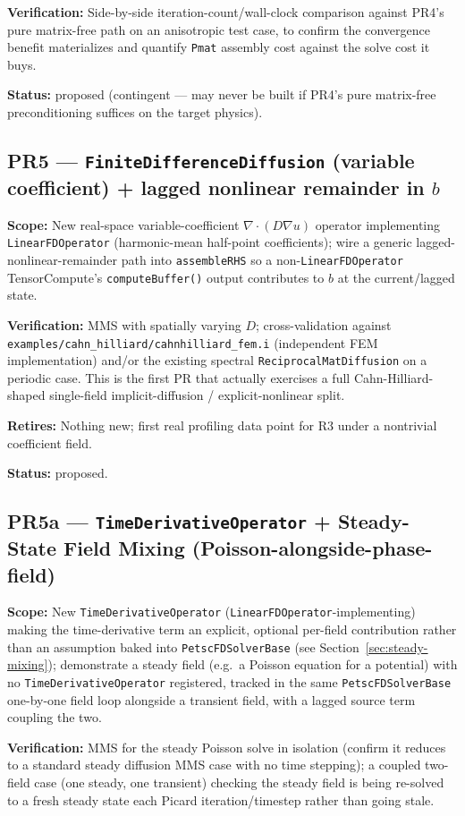 \documentclass[11pt]{article}
\newcommand{\pr}[2]{\subsection{PR#1 --- #2}}
\newcommand{\status}[1]{\textcolor{marlinteal}{\textbf{Status:}} #1}
\begin{document}
\textbf{Verification:} Side-by-side iteration-count/wall-clock comparison
against PR4's pure matrix-free path on an anisotropic test case, to confirm
the convergence benefit materializes and quantify \texttt{Pmat} assembly
cost against the solve cost it buys.

\status{proposed (contingent --- may never be built if PR4's pure
matrix-free preconditioning suffices on the target physics).}

\pr{5}{\texttt{FiniteDifferenceDiffusion} (variable coefficient) + lagged nonlinear remainder in $b$}
\textbf{Scope:} New real-space variable-coefficient $\nabla\cdot(D\nabla u)$
operator implementing \texttt{LinearFDOperator} (harmonic-mean half-point
coefficients); wire a generic lagged-nonlinear-remainder path into
\texttt{assembleRHS} so a non-\texttt{LinearFDOperator} TensorCompute's
\texttt{computeBuffer()} output contributes to $b$ at the current/lagged
state.

\textbf{Verification:} MMS with spatially varying $D$; cross-validation
against \texttt{examples/cahn\_hilliard/cahnhilliard\_fem.i} (independent
FEM implementation) and/or the existing spectral
\texttt{ReciprocalMatDiffusion} on a periodic case. This is the first PR
that actually exercises a full
Cahn-Hilliard-shaped single-field implicit-diffusion / explicit-nonlinear
split.

\textbf{Retires:} Nothing new; first real profiling data point for R3 under
a nontrivial coefficient field.

\status{proposed.}

\pr{5a}{\texttt{TimeDerivativeOperator} + Steady-State Field Mixing (Poisson-alongside-phase-field)}
\textbf{Scope:} New \texttt{TimeDerivativeOperator}
(\texttt{LinearFDOperator}-implementing) making the time-derivative term an
explicit, optional per-field contribution rather than an assumption baked
into \texttt{PetscFDSolverBase} (see Section~\ref{sec:steady-mixing});
demonstrate a steady field (e.g.\ a Poisson equation for a potential) with
no \texttt{TimeDerivativeOperator} registered, tracked in the same
\texttt{PetscFDSolverBase} one-by-one field loop alongside a transient
field, with a lagged source term coupling the two.

\textbf{Verification:} MMS for the steady Poisson solve in isolation
(confirm it reduces to a standard steady diffusion MMS case with no time
stepping); a coupled two-field case (one steady, one transient) checking
the steady field is being re-solved to a fresh steady state each Picard
iteration/timestep rather than going stale.
\end{document}
